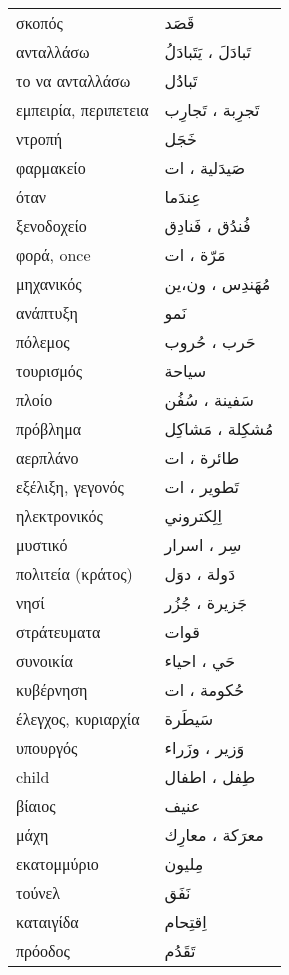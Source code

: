 \documentclass[twocolumn,a4paper]{article}
\newcommand{\ar}[1]{\textarabic{#1}}
\newcommand{\pl}{\raisebox{0.15ex}{\footnotesize ◍}}
\newcommand{\normpl}[1]{\ar{ #1، ات }}
\newcommand{\mfnormpl}[1]{\ar{ #1، ون،ين }}
\newcommand{\vrf}{\raisebox{0.15ex}{\footnotesize ◉}}
\newcommand{\mas}{\raisebox{0.15ex}{\footnotesize ◫}}
\begin{document}
\begin{mpsupertabular}{ P{0.5\textwidth} P{0.5\textwidth} }
σκοπός \mas                  & \ar{ قَصَد } \\
ανταλλάσω \vrf               & \ar{ تَبادَلَ ، يَتَبادَلُ } \\
το να ανταλλάσω \mas         & \ar{ تَبادُل } \\
εμπειρία, περιπετεια \pl     & \ar{ تَجرِبة ، تَجارِب } \\
ντροπή                       & \ar{ خَجَل } \\
φαρμακείο \pl                & \normpl{ صَيدَلية } \\
όταν                         & \ar{ عِندَما } \\
ξενοδοχείο \pl               & \ar{ فُندُق ، فَنادِق } \\
φορά, once \pl               & \normpl{ مَرّة } \\
μηχανικός \pl                & \mfnormpl{ مُهَندِس } \\
ανάπτυξη                     & \ar{ نَمو } \\
πόλεμος \pl                  & \ar{ حَرب ، حُروب } \\
τουρισμός                    & \ar{ سياحة } \\
πλοίο                        & \ar{ سَفينة ، سُفُن } \\
πρόβλημα \pl                 & \ar{ مُشكِلة ، مَشاكِل } \\
αερπλάνο \pl                 & \normpl{ طائرة } \\
εξέλιξη, γεγονός \pl         & \normpl{ تَطوير } \\
ηλεκτρονικός                 & \ar{ اِلِكتروني } \\
μυστικό \pl                  & \ar{  سِر ، اسرار } \\
πολιτεία (κράτος) \pl        & \ar{ دَولة ، دوَل } \\
νησί \pl                     & \ar{ جَزيرة ، جُزُر } \\
στράτευματα                  & \ar{ قوات } \\
συνοικία \pl                 & \ar{ حَي ، احياء } \\
κυβέρνηση \pl                & \normpl{ حُكومة } \\
έλεγχος, κυριαρχία           & \ar{ سَيطَرة } \\
υπουργός \pl                 & \ar{ وَزير ، وزَراء } \\
child \pl                    & \ar{ طِفل ، اطفال } \\
βίαιος                       & \ar{ عنيف } \\
μάχη \pl                     & \ar{ معرَكة ، معارِك } \\
εκατομμύριο                  & \ar{ مِليون } \\
τούνελ                       & \ar{ نَفَق } \\
καταιγίδα                    & \ar{ اِقتِحام } \\
πρόοδος                      & \ar{ تَقَدُم } \\


\end{mpsupertabular}
\end{document}
